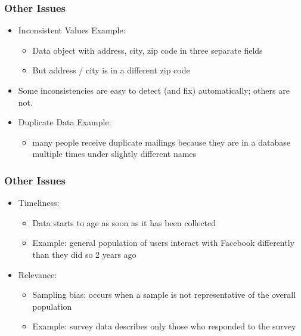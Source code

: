 \begin{frame}[fragile] \frametitle{Other Issues}
\begin{itemize}
\item Inconsistent Values Example:
	\begin{itemize}
	\item Data object with address, city, zip code in three separate fields
	\item But address / city is in a different zip code
	\end{itemize}
\item Some inconsistencies are easy to detect (and fix) automatically; others are not.
\item Duplicate Data Example:
	\begin{itemize}
	\item many people receive duplicate mailings because they are in a database multiple times under slightly different names
	\end{itemize}
\end{itemize}
\end{frame}


\begin{frame}[fragile] \frametitle{Other Issues}
\begin{itemize}
\item Timeliness:
	\begin{itemize}
	\item Data starts to age as soon as it has been collected
	\item Example: general population of users interact with Facebook differently than they did so 2 years ago
	\end{itemize}
\item Relevance:
	\begin{itemize}
	\item Sampling bias: occurs when a sample is not representative of the overall population
	\item Example: survey data describes only those who responded to the survey
	\end{itemize}
\end{itemize}
\end{frame}

